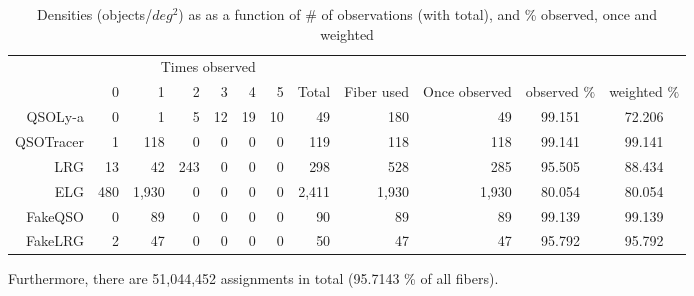 \documentclass{article}
\def\sqd{$deg^{2}$}
\begin{document}
\begin{table}[H]\begin{center}
\begin{tabular}{rrrrrrrrrrcc}
\hline
\multicolumn{6}{r}{Times observed} \\
	~ &           0 &     1 &  2 & 3 & 4 & 5 &  Total & Fiber used & Once observed & observed $\%$ & weighted $\%$ \\ \hline
    QSOLy-a   &     0 &     1 &   5 & 12 & 19 & 10 &    49 &   180 &    49 & 99.151 & 72.206 \\ 
  QSOTracer   &     1 &   118 &   0 &  0 &  0 &  0 &   119 &   118 &   118 & 99.141 & 99.141 \\ 
        LRG   &    13 &    42 & 243 &  0 &  0 &  0 &   298 &   528 &   285 & 95.505 & 88.434 \\ 
        ELG   &   480 & 1,930 &   0 &  0 &  0 &  0 & 2,411 & 1,930 & 1,930 & 80.054 & 80.054 \\ 
    FakeQSO   &     0 &    89 &   0 &  0 &  0 &  0 &    90 &    89 &    89 & 99.139 & 99.139 \\ 
    FakeLRG   &     2 &    47 &   0 &  0 &  0 &  0 &    50 &    47 &    47 & 95.792 & 95.792 \\ 
\hline
\end{tabular}
\caption{Densities (objects/\sqd) as as a function of \# of observations (with total), and \% observed, once and weighted}\label{res}
\end{center}\end{table}

Furthermore, there are 51,044,452 assignments in total (95.7143 \% of all fibers).


\end{document}
